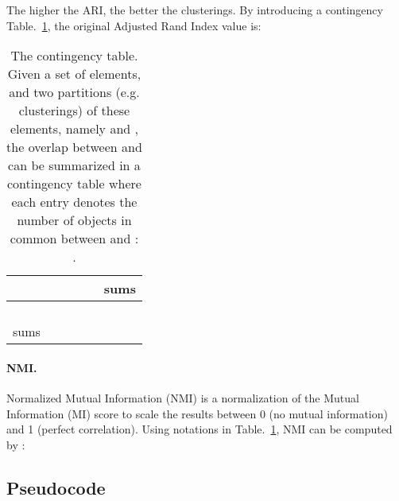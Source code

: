 \documentclass[letterpaper]{article} \usepackage{aaai22}  \usepackage{times}  \usepackage{helvet}  \usepackage{courier}  \usepackage[hyphens]{url}  \usepackage{graphicx} \urlstyle{rm} \def\UrlFont{\rm}  \usepackage{natbib}  \usepackage{caption} \DeclareCaptionStyle{ruled}{labelfont=normalfont,labelsep=colon,strut=off} \frenchspacing  \setlength{\pdfpagewidth}{8.5in}  \setlength{\pdfpageheight}{11in}  \usepackage{subfigure}
\begin{document}
The higher the ARI, the better the clusterings. By introducing a contingency Table.~\ref{tab:contingency}, the original Adjusted Rand Index value is:



\begin{table}[h]
    \centering
    \caption{The contingency table. Given a set of  elements, and two partitions (e.g. clusterings) of these elements, namely  and , the overlap between  and  can be summarized in a contingency table  where each entry  denotes the number of objects in common between  and : .}
    \begin{tabular}{c|cccc|c}
               &  &  &  &  & sums \\ \hline               
          &  &  &  &  &  \\
          &  &  &  &  &  \\
          &  &  &  &  &  \\
          &  &  &  &  &  \\ \hline
        sums   &  &  &  &  &  \\
    \end{tabular}
    \label{tab:contingency}
\end{table}


\paragraph{NMI.} Normalized Mutual Information (NMI) is a normalization of the Mutual Information (MI) score to scale the results between 0 (no mutual information) and 1 (perfect correlation). Using notations in Table.~\ref{tab:contingency}, NMI can be computed by \cite{geng2018recome}:



\clearpage
\subsection{Pseudocode}
\end{document}
